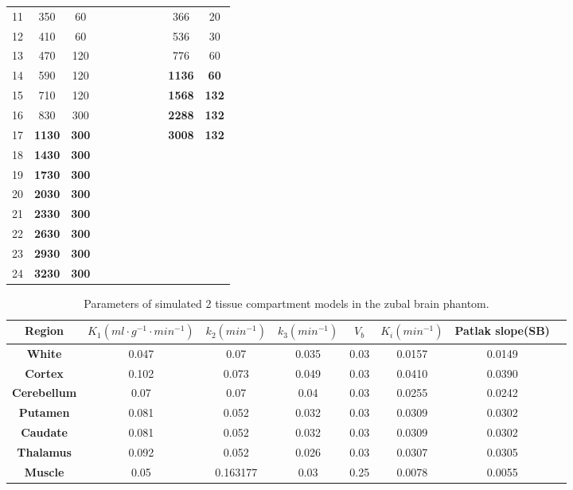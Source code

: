 \begin{table}[htb!]
\begin{tabular}{|c|c|c|c|c|c|c|c|c|c|c|}
11 & 350  & 60  & &  &  &  &  &  & 366  & 20 \\
12 & 410  & 60  & &  &  &  &  &  & 536  & 30 \\
13 & 470  & 120 & &  &  &  &  &  & 776  & 60 \\
14 & 590  & 120 & &  &  &  &  &  & \textbf{1136} & \textbf{60}  \\
15 & 710  & 120 & &  &  &  &  &  & \textbf{1568} & \textbf{132} \\
16 & 830  & 300 & &  &  &  &  &  & \textbf{2288} & \textbf{132} \\
17 & \textbf{1130} & \textbf{300} & &  &  &  &  &  & \textbf{3008} & \textbf{132} \\
18 & \textbf{1430} & \textbf{300} & & & & & & & & \\
19 & \textbf{1730} & \textbf{300} & & & & & & & & \\
20 & \textbf{2030} & \textbf{300} & & & & & & & & \\
21 & \textbf{2330} & \textbf{300} & & & & & & & & \\
22 & \textbf{2630} & \textbf{300} & & & & & & & & \\
23 & \textbf{2930} & \textbf{300} & & & & & & & & \\
24 & \textbf{3230} & \textbf{300} & & & & & & & & \\
\toprule
\end{tabular}
\label{tab:multicol}
\end{table}

\begin{table}[htb!]
\caption{Parameters of simulated 2 tissue compartment models in the zubal brain phantom.}
\label{table:KineticValues}
 \begin{tabular}{c c c c c c c c} 
\toprule
 Region & $K_1 (ml \cdot g^{-1} \cdot min^{-1})$ & $k_2 (min^{-1})$ & $k_3 (min^{-1})$ & $V_b$ & $K_i (min^{-1})$ & Patlak slope(SB) \\ [0.5ex] 
\midrule
\textbf{White}       & 0.047  & 0.07     & 0.035 & 0.03     & 0.0157 & 0.0149 \\
\textbf{Cortex}      & 0.102  & 0.073    & 0.049 & 0.03     & 0.0410 & 0.0390 \\
\textbf{Cerebellum}  & 0.07   & 0.07     & 0.04  & 0.03     & 0.0255 & 0.0242 \\
\textbf{Putamen}     & 0.081  & 0.052    & 0.032 & 0.03     & 0.0309 & 0.0302 \\
\textbf{Caudate}     & 0.081  & 0.052    & 0.032 & 0.03     & 0.0309 & 0.0302 \\
\textbf{Thalamus}    & 0.092  & 0.052    & 0.026 & 0.03     & 0.0307 & 0.0305 \\
\textbf{Muscle}      & 0.05   & 0.163177 & 0.03  & 0.25     & 0.0078 & 0.0055 \\
\toprule
\end{tabular}
\label{tab:multicol}
\end{table}

